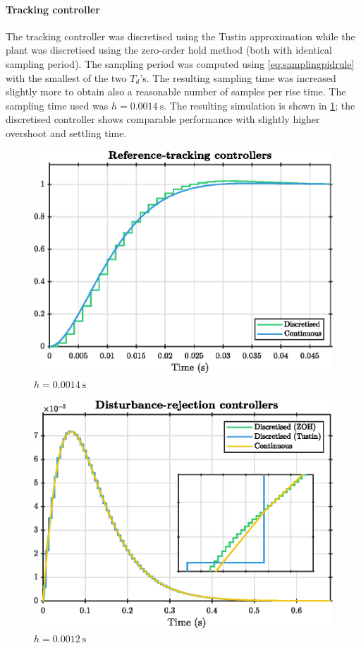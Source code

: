 \paragraph{Tracking controller}
The tracking controller was discretised using the Tustin approximation while the plant was discretised using the zero-order hold method (both with identical sampling period). The sampling period was computed using \cref{eq:samplingpidrule} with the smallest of the two $T_d$'s. The resulting sampling time was increased slightly more to obtain also a reasonable number of samples per rise time. The sampling time used was $h = \SI{0.0014}{\second}$. The resulting simulation is shown in \cref{fig:q4_dt_tracking}; the discretised controller shows comparable performance with slightly higher overshoot and settling time.
\begin{figure}[ht]
    \centering
    \includegraphics[]{media/q4/dt_tracking.eps}
    \caption{$h = \SI{0.0014}{\second}$}
    \label{fig:q4_dt_tracking}
\end{figure}

\begin{figure}[ht]
    \centering
    \includegraphics[]{media/q4/dt_distrej.eps}
    \caption{$h = \SI{0.0012}{\second}$}
    \label{fig:q4_dt_distrej}
\end{figure}
